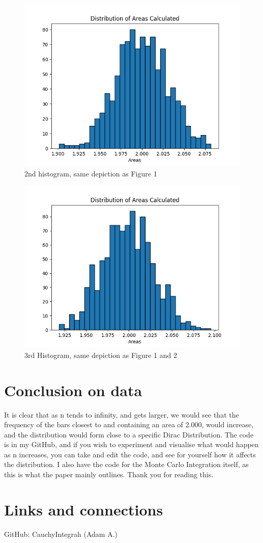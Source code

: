 \documentclass{article}
\begin{document}
    \begin{figure}
        \centering
        \includegraphics[width=0.75\linewidth]{montecarlo2.png}
        \caption{2nd histogram, same depiction as Figure 1}
        \label{fig:enter-label}
    \end{figure}
    \begin{figure}
        \centering
        \includegraphics[width=0.75\linewidth]{montecarlo3.png}
        \caption{3rd Histogram, same depiction as Figure 1 and 2}
        \label{fig:enter-label}
    \end{figure}
    \label{}
\section{Conclusion on data}
It is clear that as n tends to infinity, and gets larger, we would see that the frequency of the bars closest to and containing an area of 2.000, would increase, and the distribution would form close to a specific Dirac Distribution. The code is in my GitHub, and if you wish to experiment and visualise what would happen as n increases, you can take and edit the code, and see for yourself how it affects the distribution. I also have the code for the Monte Carlo Integration itself, as this is what the paper mainly outlines. Thank you for reading this.

\section{Links and connections}
GitHub: CauchyIntegrah (Adam A.)
\end{document}
